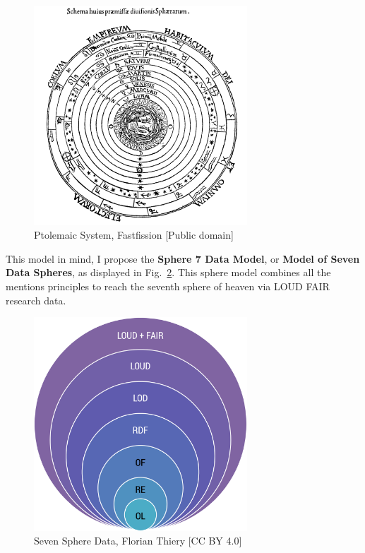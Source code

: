 \documentclass[twocolumn]{autart}
\begin{document}
\begin{figure}[!htb]
\begin{center}
\includegraphics[width=8cm]{583px-Ptolemaicsystem-small.png}
\caption{Ptolemaic System, Fastfission [Public domain]}
\label{sphere}
\end{center}
\end{figure}

This model in mind, I propose the \textcolor[rgb]{0.5,0,0.5}{\textbf{Sphere 7 Data Model}}, or \textcolor[rgb]{0.5,0,0.5}{\textbf{Model of Seven Data Spheres}}, as displayed in Fig.~\ref{ssd}. This sphere model combines all the mentions principles to reach the seventh sphere of heaven via LOUD FAIR research data.

\begin{figure}[!htb]
\begin{center}
\includegraphics[width=8cm]{Loud_fair_sphere.png}
\caption{Seven Sphere Data, Florian Thiery [CC BY 4.0]}
\label{ssd}
\end{center}
\end{figure}
\end{document}
